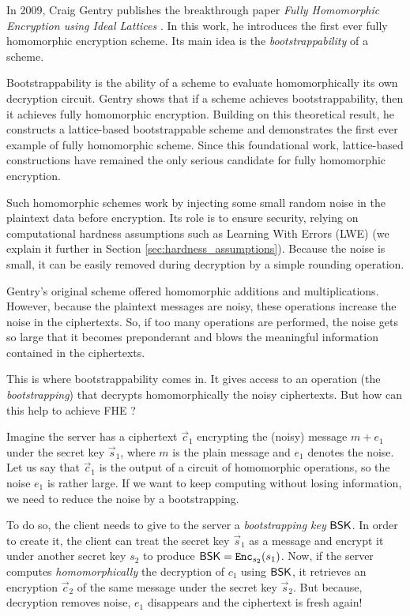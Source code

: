In 2009, Craig Gentry publishes the breakthrough paper \textit{Fully Homomorphic Encryption using Ideal Lattices} \cite{STOC:Gentry09}. In this work, he introduces the first ever fully homomorphic encryption scheme. Its main idea is the \textit{bootstrappability} of a scheme.

Bootstrappability is the ability of a scheme to evaluate homomorphically its own decryption circuit. Gentry shows that if a scheme achieves bootstrappability, then it achieves fully homomorphic encryption. Building on this theoretical result, he constructs a lattice-based bootstrappable scheme and demonstrates the first ever example of fully homomorphic scheme. Since this foundational work, lattice-based constructions have remained the only serious candidate for fully homomorphic encryption. 

Such homomorphic schemes work by injecting some small random noise in the plaintext data before encryption. Its role is to ensure security, relying on computational hardness assumptions such as Learning With Errors (LWE) (we explain it further in Section \ref{sec:hardness_assumptions}). Because the noise is small, it can be easily removed during decryption by a simple rounding operation. 

Gentry's original scheme offered homomorphic additions and multiplications. However, because the plaintext messages are noisy, these operations increase the noise in the ciphertexts. So, if too many operations are performed, the noise gets so large that it becomes preponderant and blows the meaningful information contained in the ciphertexts.

This is where bootstrappability comes in. It gives access to an operation (the \textit{bootstrapping}) that decrypts homomorphically the noisy ciphertexts. But how can this help to achieve FHE ?

Imagine the server has a ciphertext $\vec c_1$ encrypting the (noisy) message $m +e_1$ under the secret key $\vec s_1$, where $m$ is the plain message and $e_1$ denotes the noise. Let us say that $\vec c_1$ is the output of a circuit of homomorphic operations, so the noise $e_1$ is rather large. If we want to keep computing without losing information, we need to reduce the noise by a bootstrapping. 

To do so, the client needs to give to the server a \textit{bootstrapping key} $\textsf{BSK}$. In order to create it, the client can treat the secret key $\vec s_1$ as a message and encrypt it under another secret key $s_2$ to produce $\textsf{BSK} = \texttt{Enc}_{s_2}(s_1)$. Now, if the server computes \textit{homomorphically} the decryption of $c_1$ using $\textsf{BSK}$, it retrieves an encryption $\vec c_2$ of the same message under the secret key $\vec s_2$. But because, decryption removes noise, $e_1$ disappears and the ciphertext is fresh again!

